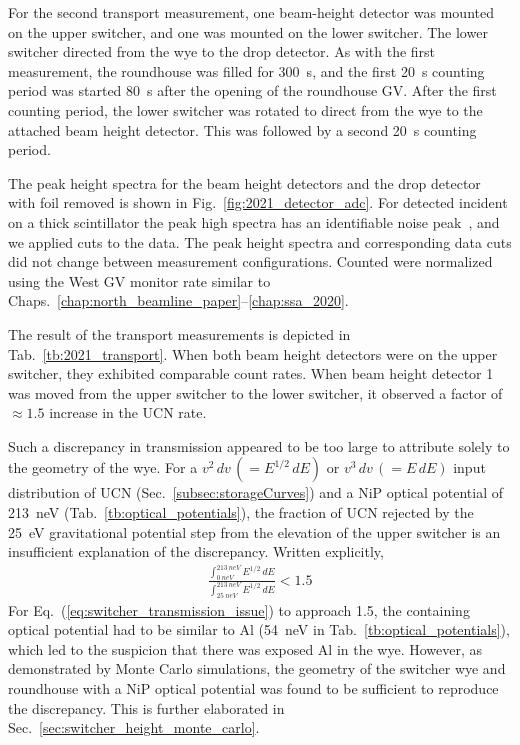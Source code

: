For the second \ucn transport measurement, one beam-height detector was mounted on the upper switcher, and one was mounted on the lower switcher. The lower switcher directed \ucn from the wye to the drop detector. As with the first measurement, the roundhouse was filled for \qty{300}{s}, and the first \qty{20}{s} counting period was started \qty{80}{s} after the opening of the roundhouse GV. After the first counting period, the lower switcher was rotated to direct \ucn from the wye to the attached beam height detector. This was followed by a second \qty{20}{s} counting period.

The peak height spectra for the beam height detectors and the drop detector with foil removed is shown in Fig.~\ref{fig:2021_detector_adc}. For detected \ucn incident on a thick \BZnS scintillator the peak high spectra has an identifiable noise peak~\cite{jeph_multilayer_2015}, and we applied cuts to the data. The peak height spectra and corresponding data cuts did not change between measurement configurations. Counted \ucn were normalized using the West GV monitor rate similar to Chaps.~\ref{chap:north_beamline_paper}--\ref{chap:ssa_2020}. 

The result of the transport measurements is depicted in Tab.~\ref{tb:2021_transport}. When both beam height detectors were on the upper switcher, they exhibited comparable count rates. When beam height detector 1 was moved from the upper switcher to the lower switcher, it observed a factor of $\approx 1.5$ increase in the UCN rate. 

Such a discrepancy in transmission appeared to be too large to attribute solely to the geometry of the wye. For a $v^2\,dv\,(=E^{1/2}\,dE)$ or $v^3\,dv\,(=E\,dE)$ input distribution of UCN (Sec.~\ref{subsec:storageCurves}) and a NiP optical potential of \qty{213}{\nano\eV} (Tab.~\ref{tb:optical_potentials}), the fraction of UCN rejected by the \qty{25}{\eV} gravitational potential step from the elevation of the upper switcher is an insufficient explanation of the discrepancy. Written explicitly,
%
\begin{gather}
    \frac{\int_{\qty{0}{neV}}^{\qty{213}{neV}}E^{1/2}\,dE}{\int_{\qty{25}{neV}}^{\qty{213}{neV}}E^{1/2}\,dE} < 1.5 \label{eq:switcher_transmission_issue}
\end{gather}
%
For Eq.~(\ref{eq:switcher_transmission_issue}) to approach 1.5, the containing optical potential had to be similar to Al (\qty{54}{\nano\eV} in Tab.~\ref{tb:optical_potentials}), which led to the suspicion that there was exposed Al in the wye. However, as demonstrated by Monte Carlo simulations, the geometry of the switcher wye and roundhouse with a NiP optical potential was found to be sufficient to reproduce the discrepancy. This is further elaborated in Sec.~\ref{sec:switcher_height_monte_carlo}.

